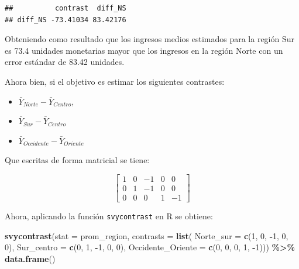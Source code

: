 \documentclass[
  spanish,
  12pt,
]{book}
\newenvironment{Shaded}{\begin{snugshade}}{\end{snugshade}}
\newcommand{\AttributeTok}[1]{\textcolor[rgb]{0.13,0.29,0.53}{#1}}
\newcommand{\DecValTok}[1]{\textcolor[rgb]{0.00,0.00,0.81}{#1}}
\newcommand{\FunctionTok}[1]{\textcolor[rgb]{0.13,0.29,0.53}{\textbf{#1}}}
\newcommand{\NormalTok}[1]{#1}
\newcommand{\SpecialCharTok}[1]{\textcolor[rgb]{0.81,0.36,0.00}{\textbf{#1}}}
\providecommand{\tightlist}{%
  \setlength{\itemsep}{0pt}\setlength{\parskip}{0pt}}
\begin{document}
\begin{verbatim}
##          contrast  diff_NS
## diff_NS -73.41034 83.42176
\end{verbatim}

Obteniendo como resultado que los ingresos medios estimados para la región Sur es 73.4 unidades monetarias mayor que los ingresos en la región Norte con un error estándar de 83.42 unidades.

Ahora bien, si el objetivo es estimar los siguientes contrastes:

\begin{itemize}
\tightlist
\item
  \(\bar{Y}_{Norte} - \bar{Y}_{Centro}\),
\item
  \(\bar{Y}_{Sur}-\bar{Y}_{Centro}\)
\item
  \(\bar{Y}_{Occidente}-\bar{Y}_{Oriente}\)
\end{itemize}

Que escritas de forma matricial se tiene:

\[
\left[\begin{array}{ccccc}
1 & 0 & -1 & 0 & 0\\
0 & 1 & -1 & 0 & 0\\
0 & 0 & 0 & 1 & -1
\end{array}\right]
\]

Ahora, aplicando la función \texttt{svycontrast} en R se obtiene:

\begin{Shaded}
\begin{Highlighting}[]
\FunctionTok{svycontrast}\NormalTok{(}\AttributeTok{stat =}\NormalTok{ prom\_region,}
            \AttributeTok{contrasts =} \FunctionTok{list}\NormalTok{(}
                             \AttributeTok{Norte\_sur =} \FunctionTok{c}\NormalTok{(}\DecValTok{1}\NormalTok{, }\DecValTok{0}\NormalTok{, }\SpecialCharTok{{-}}\DecValTok{1}\NormalTok{, }\DecValTok{0}\NormalTok{, }\DecValTok{0}\NormalTok{),}
                             \AttributeTok{Sur\_centro =} \FunctionTok{c}\NormalTok{(}\DecValTok{0}\NormalTok{, }\DecValTok{1}\NormalTok{, }\SpecialCharTok{{-}}\DecValTok{1}\NormalTok{, }\DecValTok{0}\NormalTok{, }\DecValTok{0}\NormalTok{),}
                             \AttributeTok{Occidente\_Oriente =} \FunctionTok{c}\NormalTok{(}\DecValTok{0}\NormalTok{, }\DecValTok{0}\NormalTok{, }\DecValTok{0}\NormalTok{, }\DecValTok{1}\NormalTok{, }\SpecialCharTok{{-}}\DecValTok{1}\NormalTok{))) }\SpecialCharTok{\%\textgreater{}\%}                               \FunctionTok{data.frame}\NormalTok{()}
\end{Highlighting}
\end{Shaded}
\end{document}
